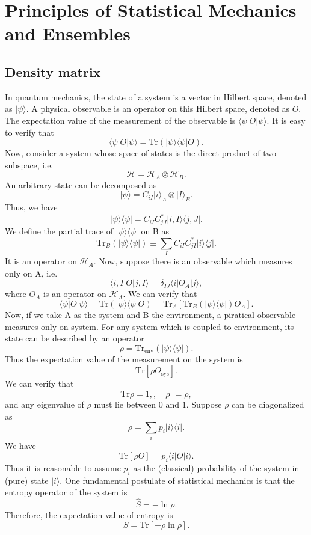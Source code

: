 \chapter{Principles of Statistical Mechanics and Ensembles}
\section{Density matrix}
In quantum mechanics, the state of a system is a vector in Hilbert space, denoted as $|\psi\rangle$. A physical observable is an operator on this Hilbert space, denoted as $O$. The expectation value of the measurement of the observable is $\langle \psi | O | \psi \rangle$. It is easy to verify that
\[\langle \psi | O | \psi \rangle = \mathrm{Tr}(| \psi \rangle \langle \psi | O).\]
Now, consider a system whose space of states is the direct product of two subspace, i.e.
\[\mathcal{H} = \mathcal{H}_A \otimes \mathcal{H}_B.\]
An arbitrary state can be decomposed as
\[|\psi\rangle = C_{iI}|i\rangle_A \otimes |I\rangle_B.\]
Thus, we have
\[| \psi \rangle \langle \psi | = C_{iI}C^*_{jJ} |i,I\rangle \langle j,J |.\]
We define the partial trace of $| \psi \rangle \langle \psi |$ on B as
\[\mathrm{Tr}_B (| \psi \rangle \langle \psi |) \equiv \sum_{I} C_{iI}C^*_{jI} |i\rangle \langle j |.\]
It is an operator on $\mathcal{H}_A$. 
Now, suppose there is an observable which measures only on A, i.e.
\[\langle i,I | O | j,I \rangle = \delta_{IJ} \langle i | O_A | j \rangle,\]
where $O_A$ is an operator on $\mathcal{H}_A$. We can verify that
\[\langle \psi | O | \psi \rangle = \mathrm{Tr}(| \psi \rangle \langle \psi | O) = \mathrm{Tr}_A \left[\mathrm{Tr}_B (| \psi \rangle \langle \psi |) O_A   \right].\]
Now, if we take A as the system and B the environment, a piratical observable measures only on system. For any system which is coupled to environment, its state can be described by an operator
\[\rho = \mathrm{Tr}_{\mathrm{env}} (| \psi \rangle \langle \psi |).\]
Thus the expectation value of the measurement on the system is
\[\mathrm{Tr}[\rho O_{\mathrm{sys}}].\]
We can verify that
\[\mathrm{Tr}\rho = 1 ,, \quad \rho^{\dagger} = \rho,\]
and any eigenvalue of $\rho$ must lie between $0$ and $1$. 
Suppose $\rho$ can be diagonalized as
\[\rho = \sum_i p_i |i\rangle\langle i |.\]
We have
\[\mathrm{Tr}[\rho O] = p_i \langle i | O | i \rangle.\]
Thus it is reasonable to assume $p_i$ as the (classical) probability of the system in (pure) state $|i\rangle$.
One fundamental postulate of statistical mechanics is that the entropy operator of the system is
\[\hat{S} = -\ln \rho.\]
Therefore, the expectation value of entropy is
\[S = \mathrm{Tr}[-\rho\ln\rho].\]

